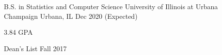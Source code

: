 \begin{cventries}
  \cventry
    {B.S. in Statistics and Computer Science}
    {University of Illinois at Urbana Champaign}
    {Urbana, IL}
    {Dec 2020 (Expected)}
    {
      \begin{cvitems}
        \item {3.84 GPA}
        \item {Dean's List Fall 2017}
      \end{cvitems}
    }
\end{cventries}
